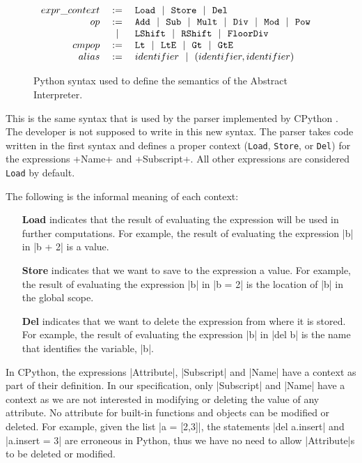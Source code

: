 \begin{figure}
\[\begin{array}{rclr}
  expr\_context &:=& \texttt{Load} ~~|~~ \texttt{Store} ~~|~~ \texttt{Del}  & \\

  op &:=& \texttt{Add} ~~|~~ \texttt{Sub} ~~|~~ \texttt{Mult} ~~|~~ \texttt{Div} ~~|~~
         \texttt{Mod} ~~|~~ \texttt{Pow} \\
     &~~|~~& \texttt{LShift} ~~|~~ \texttt{RShift} ~~|~~ \texttt{FloorDiv}  & \\
  cmpop &:=& \texttt{Lt} ~~|~~ \texttt{LtE} ~~|~~ \texttt{Gt} ~~|~~ \texttt{GtE}  & \\

  alias &:=& identifier ~~|~~ (identifier, identifier) & \\

\end{array}\]
\caption{Python syntax used to define the semantics of the Abstract Interpreter.\label{syntaxPython2}}
\end{figure}

This is the same syntax that is used by the parser implemented by CPython
\autocite{van2007python}. The developer is not supposed to write in this new syntax. The
parser takes code written in the first syntax and defines a proper context (\verb|Load|,
\verb|Store|, or \verb|Del|) for the expressions \pycode+Name+ and \pycode+Subscript+. All
other expressions are considered \verb|Load| by default.

The following is the informal meaning of each context:

\begin{itemize}
\tightlist
\item[\textbf{Load}] indicates that the result of evaluating the expression will be used
  in further computations. For example, the result of evaluating the expression \pycode|b|
  in \pycode|b + 2| is a value.
\item[\textbf{Store}] indicates that we want to save to the expression a value. For
  example, the result of evaluating the expression \pycode|b| in \pycode|b = 2| is the
  location of \pycode|b| in the global scope.
\item[\textbf{Del}] indicates that we want to delete the expression from where it is stored.
  For example, the result of evaluating the expression \pycode|b| in \pycode|del b| is the
  name that identifies the variable, \pycode|b|.
\end{itemize}

In CPython, the expressions \pycode|Attribute|, \pycode|Subscript| and \pycode|Name| have a
context as part of their definition. In our specification, only \pycode|Subscript| and
\pycode|Name| have a context as we are not interested in modifying or deleting the value
of any attribute. No attribute for built-in functions and objects can be modified or
deleted. For example, given the list \pycode|a = [2,3]|, the statements
\pycode|del a.insert| and \pycode|a.insert = 3| are erroneous in Python, thus we have no
need to allow \pycode|Attribute|s to be deleted or modified.


